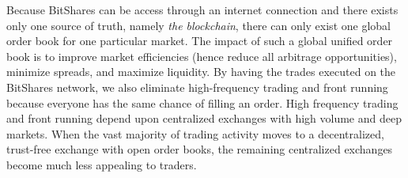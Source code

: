 Because BitShares can be access through an internet connection and there exists
only one source of truth, namely \emph{the blockchain}, there can only exist
one global order book for one particular market. The impact of such a global
unified order book is to improve market efficiencies (hence reduce all
arbitrage opportunities), minimize spreads, and maximize liquidity. By having
the trades executed on the BitShares network, we also eliminate high-frequency
trading and front running because everyone has the same chance of filling an
order. High frequency trading and front running depend upon centralized
exchanges with high volume and deep markets. When the vast majority of trading
activity moves to a decentralized, trust-free exchange with open order books,
the remaining centralized exchanges become much less appealing to traders.

